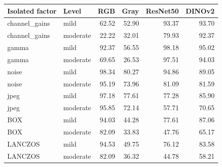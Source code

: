\begin{tabular}{llrrrr}
\toprule
Isolated factor & Level & RGB & Gray & ResNet50 & DINOv2 \\
\midrule
channel\_gains & mild & 62.52 & 52.90 & 93.37 & 93.70 \\
channel\_gains & moderate & 22.22 & 32.01 & 79.93 & 92.37 \\
gamma & mild & 92.37 & 56.55 & 98.18 & 95.02 \\
gamma & moderate & 69.65 & 26.53 & 97.51 & 94.03 \\
noise & mild & 98.34 & 80.27 & 94.86 & 89.05 \\
noise & moderate & 95.19 & 73.96 & 81.09 & 81.59 \\
jpeg & mild & 97.18 & 77.61 & 77.28 & 85.90 \\
jpeg & moderate & 95.85 & 72.14 & 57.71 & 70.65 \\
BOX & mild & 94.03 & 44.28 & 77.61 & 87.06 \\
BOX & moderate & 82.09 & 33.83 & 47.76 & 65.17 \\
LANCZOS & mild & 94.53 & 49.75 & 76.12 & 83.58 \\
LANCZOS & moderate & 82.09 & 36.32 & 44.78 & 58.21 \\
\bottomrule
\end{tabular}
